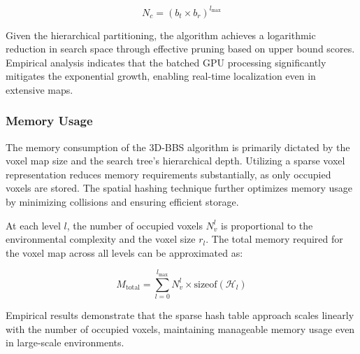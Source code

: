 $$N_c = (b_t \times b_r)^{l_{\text{max}}}$$

Given the hierarchical partitioning, the algorithm achieves a logarithmic reduction in search space through effective pruning based on upper bound scores. Empirical analysis indicates that the batched GPU processing significantly mitigates the exponential growth, enabling real-time localization even in extensive maps.

\subsubsection{Memory Usage}
The memory consumption of the 3D-BBS algorithm is primarily dictated by the voxel map size and the search tree's hierarchical depth. Utilizing a sparse voxel representation reduces memory requirements substantially, as only occupied voxels are stored. The spatial hashing technique further optimizes memory usage by minimizing collisions and ensuring efficient storage.

At each level $l$, the number of occupied voxels $N_v^l$ is proportional to the environmental complexity and the voxel size $r_l$. The total memory required for the voxel map across all levels can be approximated as:

$$M_{\text{total}} = \sum_{l=0}^{l_{\text{max}}} N_v^l \times \text{sizeof}(\mathcal{H}_l)$$

Empirical results demonstrate that the sparse hash table approach scales linearly with the number of occupied voxels, maintaining manageable memory usage even in large-scale environments.
